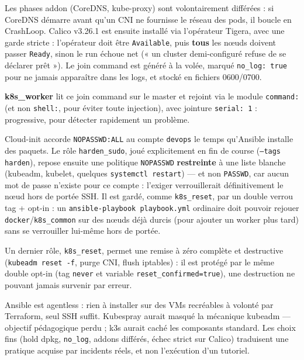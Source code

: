 \documentclass[12pt,a4paper,twoside,openright]{report}
\begin{document}
Les phases addon (CoreDNS, kube-proxy) sont volontairement différées : si CoreDNS
démarre avant qu'un CNI ne fournisse le réseau des pods, il boucle en CrashLoop.
Calico v3.26.1 est ensuite installé via l'opérateur Tigera, avec une garde stricte :
l'opérateur doit être \texttt{Available}, puis \textbf{tous} les nœuds doivent passer
\texttt{Ready}, sinon le run échoue net (« un cluster demi-configuré refuse de se
déclarer prêt »). Le join command est généré à la volée, marqué
\texttt{no\_log: true} pour ne jamais apparaître dans les logs, et stocké en fichiers
0600/0700.

\textbf{k8s\_worker} lit ce join command sur le master et rejoint via le module
\texttt{command:} (et non \texttt{shell:}, pour éviter toute injection), avec
jointure \texttt{serial: 1} : progressive, pour détecter rapidement un problème.

\begin{whybox}[title={Un durcissement en deux temps}]
\label{sec:harden-sudo}
Cloud-init accorde \texttt{NOPASSWD:ALL} au compte \texttt{devops} le temps
qu'Ansible installe des paquets. Le rôle \texttt{harden\_sudo}, joué explicitement
en fin de course (\texttt{--tags harden}), repose ensuite une politique
\texttt{NOPASSWD} \textbf{restreinte} à une liste blanche (kubeadm, kubelet,
quelques \texttt{systemctl restart}) — et non \texttt{PASSWD}, car aucun mot de
passe n'existe pour ce compte : l'exiger verrouillerait définitivement le nœud hors
de portée SSH. Il est gardé, comme \texttt{k8s\_reset}, par un double verrou
tag + opt-in : un \texttt{ansible-playbook playbook.yml} ordinaire doit pouvoir
rejouer \texttt{docker}/\texttt{k8s\_common} sur des nœuds déjà durcis (pour ajouter
un worker plus tard) sans se verrouiller lui-même hors de portée.
\end{whybox}

Un dernier rôle, \texttt{k8s\_reset}, permet une remise à zéro complète et
destructive (\texttt{kubeadm reset -f}, purge CNI, flush iptables) : il est protégé
par le même double opt-in (tag \texttt{never} et variable
\texttt{reset\_confirmed=true}), une destruction ne pouvant jamais survenir par
erreur.

\begin{whybox}[title={Justification du choix Ansible plutôt que ses alternatives}]
Ansible est agentless : rien à installer sur des VMs recréables à volonté par
Terraform, seul SSH suffit. Kubespray aurait masqué la mécanique kubeadm — objectif
pédagogique perdu ; k3s aurait caché les composants standard. Les choix fins (hold
dpkg, \texttt{no\_log}, addons différés, échec strict sur Calico) traduisent une
pratique acquise par incidents réels, et non l'exécution d'un tutoriel.
\end{whybox}
\end{document}
